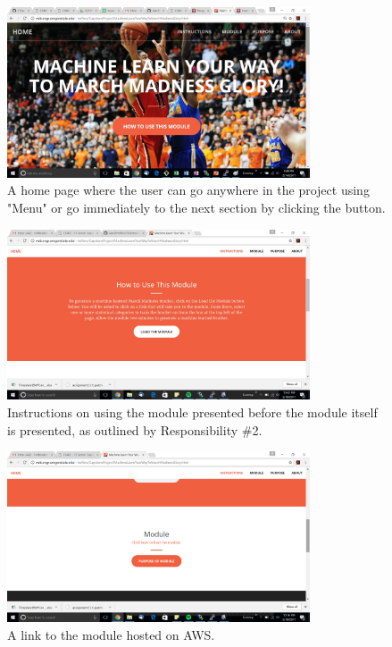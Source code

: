 \documentclass[onecolumn, draftclsnofoot,10pt, compsoc]{IEEEtran}
\begin{document}
\begin{figure}[H]
\centering
\includegraphics[width=0.8\textwidth]{images/dv}
\caption{A home page where the user can go anywhere in the project using "Menu" or go immediately to the next section by clicking the button.}
\label{fig1}
\end{figure}

\begin{figure}[H]
\centering
\includegraphics[width=0.8\textwidth]{images/Instructions}
\caption{Instructions on using the module presented before the module itself is presented, as outlined by Responsibility \#2.}
\label{fig2}
\end{figure}

\begin{figure}[H]
\centering
\includegraphics[width=0.8\textwidth]{images/Module}
\caption{A link to the module hosted on AWS.}
\label{fig3}
\end{figure}
\end{document}
